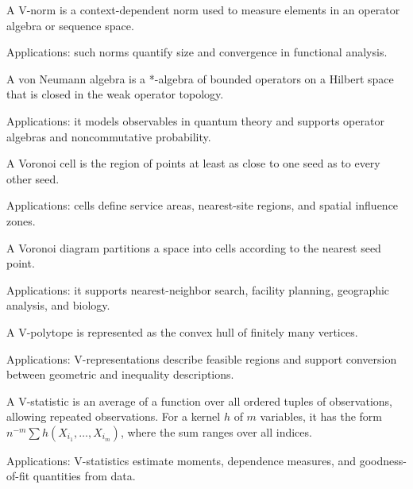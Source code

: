 A V-norm is a context-dependent norm used to measure elements in an operator algebra or sequence space. \par\noindent Applications: such norms quantify size and convergence in functional analysis.

A von Neumann algebra is a *-algebra of bounded operators on a Hilbert space that is closed in the weak operator topology. \par\noindent Applications: it models observables in quantum theory and supports operator algebras and noncommutative probability.

A Voronoi cell is the region of points at least as close to one seed as to every other seed. \par\noindent Applications: cells define service areas, nearest-site regions, and spatial influence zones.

A Voronoi diagram partitions a space into cells according to the nearest seed point. \par\noindent Applications: it supports nearest-neighbor search, facility planning, geographic analysis, and biology.

A V-polytope is represented as the convex hull of finitely many vertices. \par\noindent Applications: V-representations describe feasible regions and support conversion between geometric and inequality descriptions.

A V-statistic is an average of a function over all ordered tuples of observations, allowing repeated observations. For a kernel $h$ of $m$ variables, it has the form $n^{-m}\sum h(X_{i_1},\ldots,X_{i_m})$, where the sum ranges over all indices. \par\noindent Applications: V-statistics estimate moments, dependence measures, and goodness-of-fit quantities from data.
